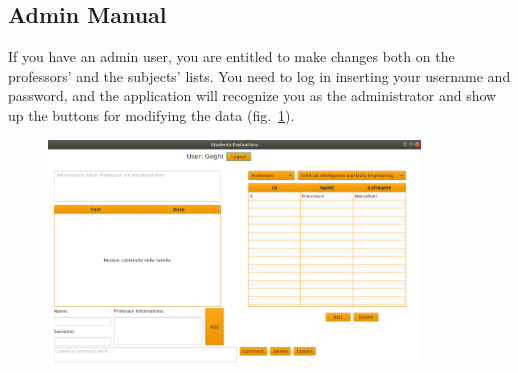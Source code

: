 \documentclass[a4paper]{article}
\begin{document}
\clearpage
\subsection{Admin Manual}
If you have an admin user, you are entitled to make changes both on the professors' and the subjects' lists. You need to log in inserting your username and password, and the application will recognize you as the administrator and show up the buttons for modifying the data (fig.~\ref{fig:adminLogin}).

\begin{figure}[h]
\centering
\includegraphics[width=0.88\textwidth]{images/screens/adminLogin}
\label{fig:adminLogin}
\end{figure}
\end{document}
